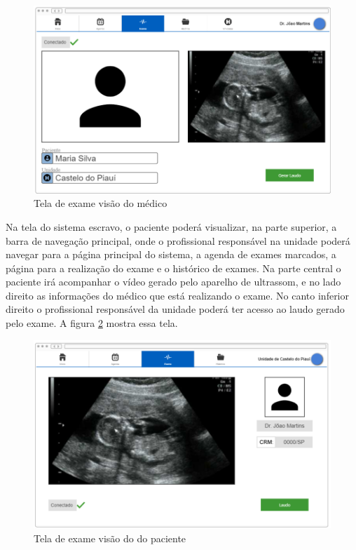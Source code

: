 \begin{figure}[H]
	\centering	\includegraphics[keepaspectratio=true,scale=0.5]{figuras/3_0_exame_medico.png}
	\caption{Tela de exame visão do médico}
	\label{soft_7}
\end{figure}

Na tela do sistema escravo, o paciente poderá visualizar, na parte superior, a barra de navegação principal, onde o profissional responsável na unidade poderá navegar para a página principal do sistema, a agenda de exames marcados, a página para a realização do exame e o histórico de exames. Na parte central o paciente irá acompanhar o vídeo gerado pelo aparelho de ultrassom, e no lado direito as informações do médico que está realizando o exame. No canto inferior direito o profissional responsável da unidade poderá ter acesso ao laudo gerado pelo exame. A figura \ref{soft_8} mostra essa tela.

\begin{figure}[H]
	\centering	\includegraphics[keepaspectratio=true,scale=0.5]{figuras/3_1_exame_paciente.png}
	\caption{Tela de exame visão do do paciente}
	\label{soft_8}
\end{figure}
